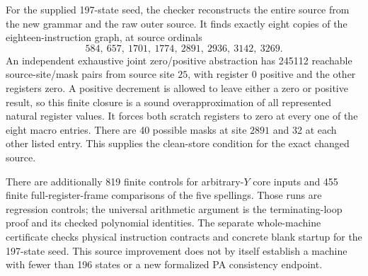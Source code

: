 For the supplied 197-state seed, the checker reconstructs the entire
source from the new grammar and the raw outer source. It finds exactly
eight copies of the eighteen-instruction graph, at source ordinals
\[
 584,\ 657,\ 1701,\ 1774,\ 2891,\ 2936,\ 3142,\ 3269.
\]
An independent exhaustive joint zero/positive abstraction has 245112
reachable source-site/mask pairs from source site $25$, with register
$0$ positive and the other registers zero. A positive decrement is
allowed to leave either a zero or positive result, so this finite
closure is a sound overapproximation of all represented natural
register values. It forces both scratch registers to zero at every
one of the eight macro entries. There are 40 possible masks at site
$2891$ and 32 at each other listed entry. This supplies the clean-store
condition for the exact changed source.

There are additionally 819 finite controls for arbitrary-$Y$ core
inputs and 455 finite full-register-frame comparisons of the five
spellings. Those runs are regression controls; the universal arithmetic
argument is the terminating-loop proof and its checked polynomial
identities. The separate whole-machine certificate checks physical
instruction contracts and concrete blank startup for the 197-state
seed. This source improvement does not by itself establish a machine
with fewer than 196 states or a new formalized PA consistency endpoint.
